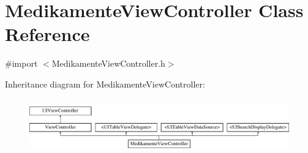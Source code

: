 \hypertarget{interface_medikamente_view_controller}{}\section{Medikamente\+View\+Controller Class Reference}
\label{interface_medikamente_view_controller}


{\ttfamily \#import $<$Medikamente\+View\+Controller.\+h$>$}

Inheritance diagram for Medikamente\+View\+Controller\+:\begin{figure}[H]
\begin{center}
\leavevmode
\includegraphics[height=2.359551cm]{interface_medikamente_view_controller}
\end{center}
\end{figure}
